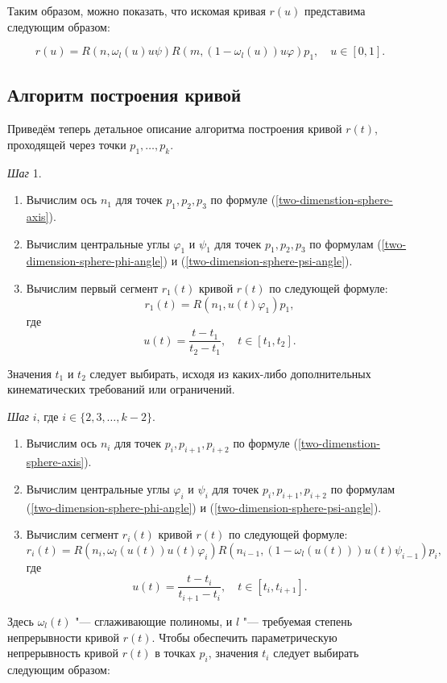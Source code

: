 Таким образом, можно показать, что искомая кривая $r(u)$ представима следующим образом:

$$
r(u)=R(n,\omega_l(u)u\psi)R(m,(1-\omega_l(u))u\varphi)p_1, \quad u \in [0,1].
$$

\subsection*{Алгоритм построения кривой}

Приведём теперь детальное описание алгоритма построения кривой $r(t)$, проходящей через точки $p_1,\dots,p_k$.

\bigskip
\textit{Шаг} 1.

\begin{enumerate}
\item Вычислим ось $n_1$ для точек $p_1, p_2, p_3$ по формуле (\ref{two-dimenstion-sphere-axis}).
\item Вычислим центральные углы $\varphi_1$ и $\psi_1$ для точек $p_1, p_2, p_3$ по формулам
(\ref{two-dimension-sphere-phi-angle}) и (\ref{two-dimension-sphere-psi-angle}).
\item Вычислим первый сегмент $r_1(t)$ кривой $r(t)$ по следующей формуле:
$$
r_1(t)=R(n_1,u(t)\varphi_1)p_1,
$$
\noindent где
$$
u(t)=\frac{t-t_1}{t_2-t_1}, \quad t \in [t_1,t_2].
$$
\end{enumerate}

Значения $t_1$ и $t_2$ следует выбирать, исходя из каких-либо дополнительных кинематических требований или ограничений.

\bigskip
\textit{Шаг} $i$, где $i \in \{2,3,\dots,k-2\}$.

\begin{enumerate}
\item Вычислим ось $n_i$ для точек $p_i, p_{i+1}, p_{i+2}$ по формуле (\ref{two-dimenstion-sphere-axis}).
\item Вычислим центральные углы $\varphi_i$ и $\psi_i$ для точек $p_i, p_{i+1}, p_{i+2}$ по формулам
(\ref{two-dimension-sphere-phi-angle}) и (\ref{two-dimension-sphere-psi-angle}).
\item Вычислим сегмент $r_i(t)$ кривой $r(t)$ по следующей формуле:
$$
r_i(t)=R(n_i,\omega_l(u(t))u(t)\varphi_i)R(n_{i-1},(1-\omega_l(u(t)))u(t)\psi_{i-1})p_i,
$$
\noindent где
$$
u(t)=\frac{t-t_i}{t_{i+1}-t_i}, \quad t \in [t_i,t_{i+1}].
$$
\end{enumerate}

Здесь $\omega_l(t)$ "--- сглаживающие полиномы, и $l$ "--- требуемая степень непрерывности кривой $r(t)$. Чтобы обеспечить
параметрическую непрерывность кривой $r(t)$ в точках $p_i$, значения $t_i$ следует выбирать следующим образом:


